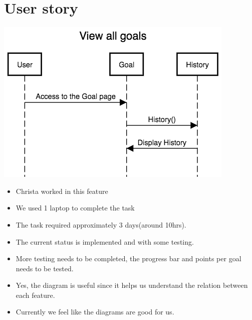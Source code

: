 \documentclass[a4paper]{article}
\begin{document}
\section{User story}
\includegraphics[width=\textwidth]{view_goals.png} 
\newline
\newline
\newline
\begin{itemize}
  \item Christa worked in this feature 
  \item We used 1 laptop to complete the task
  \item The task required approximately 3 days(around 10hrs).
  \item The current status is implemented and with some testing.
  \item More testing needs to be completed, the progress bar and points per goal needs to be tested.
  \item Yes, the diagram is useful since it helps us understand the relation between each feature.
  \item Currently we feel like the diagrams are good for us.
\end{itemize}
\end{document}
